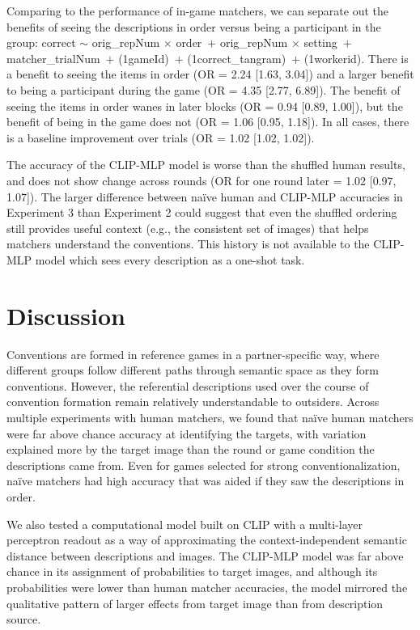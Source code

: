 \documentclass[10pt, letterpaper]{article}
\begin{document}
Comparing to the performance of in-game matchers, we can separate out
the benefits of seeing the descriptions in order versus being a
participant in the group: correct \({\sim}\) orig\_repNum \({\times}\)
order~\({+}\) orig\_repNum \({\times}\) setting~\({+}\)
matcher\_trialNum~\({+}\) (1\textbar gameId)~\({+}\)
(1\textbar correct\_tangram)~\({+}\) (1\textbar workerid). There is a
benefit to seeing the items in order (OR = 2.24 {[}1.63, 3.04{]}) and a
larger benefit to being a participant during the game (OR = 4.35
{[}2.77, 6.89{]}). The benefit of seeing the items in order wanes in
later blocks (OR = 0.94 {[}0.89, 1.00{]}), but the benefit of being in
the game does not (OR = 1.06 {[}0.95, 1.18{]}). In all cases, there is a
baseline improvement over trials (OR = 1.02 {[}1.02, 1.02{]}).

The accuracy of the CLIP-MLP model is worse than the shuffled human
results, and does not show change across rounds (OR for one round later
= 1.02 {[}0.97, 1.07{]}). The larger difference between naïve human and
CLIP-MLP accuracies in Experiment 3 than Experiment 2 could suggest that
even the shuffled ordering still provides useful context (e.g., the
consistent set of images) that helps matchers understand the
conventions. This history is not available to the CLIP-MLP model which
sees every description as a one-shot task.

\section{Discussion}\label{discussion}

Conventions are formed in reference games in a partner-specific way,
where different groups follow different paths through semantic space as
they form conventions. However, the referential descriptions used over
the course of convention formation remain relatively understandable to
outsiders. Across multiple experiments with human matchers, we found
that naïve human matchers were far above chance accuracy at identifying
the targets, with variation explained more by the target image than the
round or game condition the descriptions came from. Even for games
selected for strong conventionalization, naïve matchers had high
accuracy that was aided if they saw the descriptions in order.

We also tested a computational model built on CLIP with a multi-layer
perceptron readout as a way of approximating the context-independent
semantic distance between descriptions and images. The CLIP-MLP model
was far above chance in its assignment of probabilities to target
images, and although its probabilities were lower than human matcher
accuracies, the model mirrored the qualitative pattern of larger effects
from target image than from description source.
\end{document}
